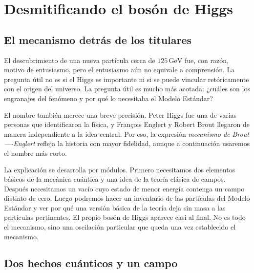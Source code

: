 \chapter{Desmitificando el bosón de Higgs}


\section{El mecanismo detrás de los titulares}

El descubrimiento de una nueva partícula cerca de $125\,\mathrm{GeV}$ fue, con razón, motivo de entusiasmo, pero el entusiasmo aún no equivale a comprensión. La pregunta útil no es si el Higgs es importante ni si se puede vincular retóricamente con el origen del universo. La pregunta útil es mucho más acotada: ¿cuáles son los engranajes del fenómeno y por qué lo necesitaba el Modelo Estándar?

El nombre también merece una breve precisión. Peter Higgs fue una de varias personas que identificaron la física, y Fran\c{c}ois Englert y Robert Brout llegaron de manera independiente a la idea central. Por eso, la expresión \emph{mecanismo de Brout----Englert} refleja la historia con mayor fidelidad, aunque a continuación usaremos el nombre más corto.

La explicación se desarrolla por módulos. Primero necesitamos dos elementos básicos de la mecánica cuántica y una idea de la teoría clásica de campos. Después necesitamos un vacío cuyo estado de menor energía contenga un campo distinto de cero. Luego podremos hacer un inventario de las partículas del Modelo Estándar y ver por qué una versión básica de la teoría deja sin masa a las partículas pertinentes. El propio bosón de Higgs aparece casi al final. No es todo el mecanismo, sino una oscilación particular que queda una vez establecido el mecanismo.

\section{Dos hechos cuánticos y un campo}

